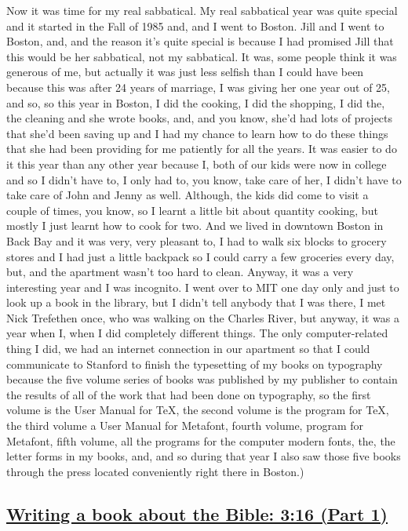\documentclass[]{article}
\begin{document}
Now it was time for my real sabbatical. My real sabbatical year was
quite special and it started in the Fall of 1985 and, and I went to
Boston. Jill and I went to Boston, and, and the reason it's quite
special is because I had promised Jill that this would be her
sabbatical, not my sabbatical. It was, some people think it was generous
of me, but actually it was just less selfish than I could have been
because this was after 24 years of marriage, I was giving her one year
out of 25, and so, so this year in Boston, I did the cooking, I did the
shopping, I did the, the cleaning and she wrote books, and, and you
know, she'd had lots of projects that she'd been saving up and I had my
chance to learn how to do these things that she had been providing for
me patiently for all the years. It was easier to do it this year than
any other year because I, both of our kids were now in college and so I
didn't have to, I only had to, you know, take care of her, I didn't have
to take care of John and Jenny as well. Although, the kids did come to
visit a couple of times, you know, so I learnt a little bit about
quantity cooking, but mostly I just learnt how to cook for two. And we
lived in downtown Boston in Back Bay and it was very, very pleasant to,
I had to walk six blocks to grocery stores and I had just a little
backpack so I could carry a few groceries every day, but, and the
apartment wasn't too hard to clean. Anyway, it was a very interesting
year and I was incognito. I went over to MIT one day only and just to
look up a book in the library, but I didn't tell anybody that I was
there, I met Nick Trefethen once, who was walking on the Charles River,
but anyway, it was a year when I, when I did completely different
things. The only computer-related thing I did, we had an internet
connection in our apartment so that I could communicate to Stanford to
finish the typesetting of my books on typography because the five volume
series of books was published by my publisher to contain the results of
all of the work that had been done on typography, so the first volume is
the User Manual for TeX, the second volume is the program for TeX, the
third volume a User Manual for Metafont, fourth volume, program for
Metafont, fifth volume, all the programs for the computer modern fonts,
the, the letter forms in my books, and, and so during that year I also
saw those five books through the press located conveniently right there
in Boston.)

\subsection{\texorpdfstring{\href{http://webofstories.com/play/17131}{Writing
a book about the Bible: 3:16 (Part
1)}}{Writing a book about the Bible: 3:16 (Part 1)}}\label{writing-a-book-about-the-bible-316-part-1}
\end{document}
